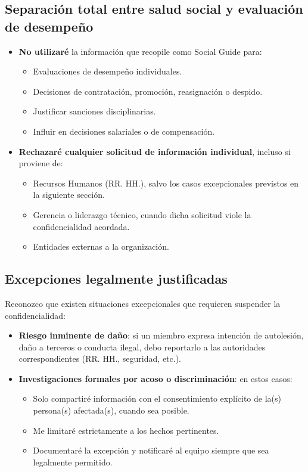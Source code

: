 \subsection{Separación total entre salud social y evaluación de desempeño}

\begin{itemize}
    \item \textbf{No utilizaré} la información que recopile como Social Guide para:
          \begin{itemize}
              \item Evaluaciones de desempeño individuales.
              \item Decisiones de contratación, promoción, reasignación o despido.
              \item Justificar sanciones disciplinarias.
              \item Influir en decisiones salariales o de compensación.
          \end{itemize}

    \item \textbf{Rechazaré cualquier solicitud de información individual}, incluso si proviene de:
          \begin{itemize}
              \item Recursos Humanos (RR. HH.), salvo los casos excepcionales previstos en la siguiente sección.
              \item Gerencia o liderazgo técnico, cuando dicha solicitud viole la confidencialidad acordada.
              \item Entidades externas a la organización.
          \end{itemize}
\end{itemize}

\subsection{Excepciones legalmente justificadas}

Reconozco que existen situaciones excepcionales que requieren suspender la confidencialidad:

\begin{itemize}
    \item \textbf{Riesgo inminente de daño}: si un miembro expresa intención de autolesión, daño a terceros o conducta ilegal, debo reportarlo a las autoridades correspondientes (RR. HH., seguridad, etc.).

    \item \textbf{Investigaciones formales por acoso o discriminación}: en estos casos:
          \begin{itemize}
              \item Solo compartiré información con el consentimiento explícito de la(s) persona(s) afectada(s), cuando sea posible.
              \item Me limitaré estrictamente a los hechos pertinentes.
              \item Documentaré la excepción y notificaré al equipo siempre que sea legalmente permitido.
          \end{itemize}
\end{itemize}

